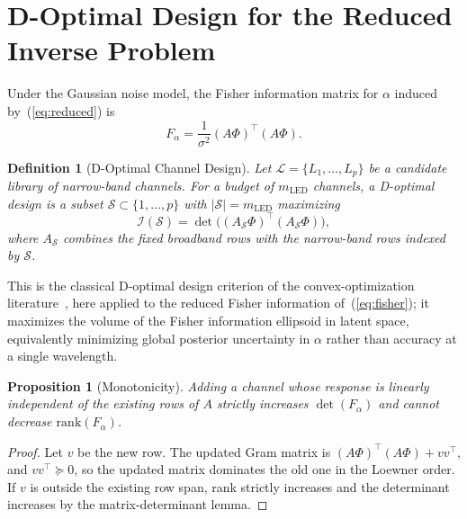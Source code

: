 \documentclass[11pt]{article}
\newtheorem{Definition}{Definition}
\newtheorem{Proposition}{Proposition}
\begin{document}
\section{D-Optimal Design for the Reduced Inverse Problem}
\label{sec:doptimal}

Under the Gaussian noise model, the Fisher information matrix for $\alpha$ induced by~(\ref{eq:reduced}) is
\begin{equation}
F_\alpha = \frac{1}{\sigma^2}(A\Phi)^\top(A\Phi).
\label{eq:fisher}
\end{equation}

\begin{Definition}[D-Optimal Channel Design]
\label{def:doptimal}
Let $\mathcal{L} = \{L_1,\ldots,L_p\}$ be a candidate library of narrow-band channels. For a budget of $m_{\mathrm{LED}}$ channels, a D-optimal design is a subset $\mathcal{S} \subset \{1,\ldots,p\}$ with $|\mathcal{S}| = m_{\mathrm{LED}}$ maximizing
\begin{equation}
\mathcal{I}(\mathcal{S}) = \det\big((A_\mathcal{S}\Phi)^\top(A_\mathcal{S}\Phi)\big),
\label{eq:doptimal}
\end{equation}
where $A_\mathcal{S}$ combines the fixed broadband rows with the narrow-band rows indexed by $\mathcal{S}$.
\end{Definition}

This is the classical D-optimal design criterion of the convex-optimization literature~\citep{ref3}, here applied to the reduced Fisher information of~(\ref{eq:fisher}); it maximizes the volume of the Fisher information ellipsoid in latent space, equivalently minimizing global posterior uncertainty in $\alpha$ rather than accuracy at a single wavelength.

\begin{Proposition}[Monotonicity]
\label{prop:rank}
Adding a channel whose response is linearly independent of the existing rows of $A$ strictly increases $\det(F_\alpha)$ and cannot decrease $\mathrm{rank}(F_\alpha)$.
\end{Proposition}
\begin{proof}
Let $v$ be the new row. The updated Gram matrix is $(A\Phi)^\top(A\Phi) + vv^\top$, and $vv^\top\succeq0$, so the updated matrix dominates the old one in the Loewner order. If $v$ is outside the existing row span, rank strictly increases and the determinant increases by the matrix-determinant lemma.
\end{proof}
\end{document}
